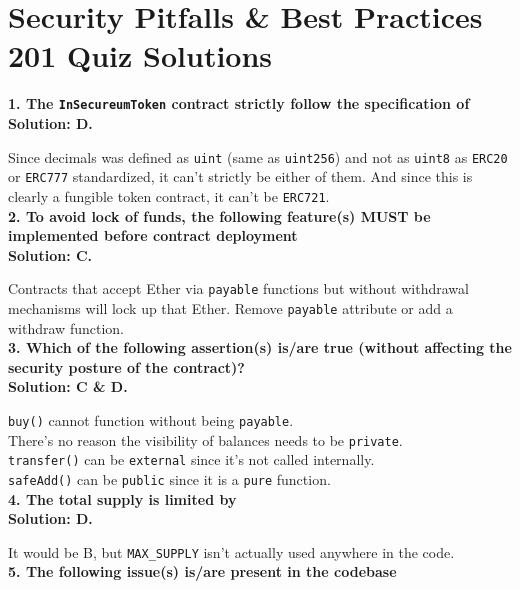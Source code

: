 \section{Security Pitfalls \& Best Practices 201 Quiz Solutions}

\textbf{1. The \texttt{InSecureumToken} contract strictly follow the specification of}\label{sec:exam5_q1}\\

\textbf{Solution: D.}

Since decimals was defined as \verb|uint| (same as \verb|uint256|) and not as \verb|uint8| as \verb|ERC20| or \verb|ERC777| standardized, it can't strictly be either of them.
And since this is clearly a fungible token contract, it can't be \verb|ERC721|.\\

\textbf{2. To avoid lock of funds, the following feature(s) MUST be implemented before contract deployment}\label{sec:exam5_q2}\\

\textbf{Solution: C.}

Contracts that accept Ether via \verb|payable| functions but without withdrawal mechanisms will lock up that Ether.
Remove \verb|payable| attribute or add a withdraw function.\\

\textbf{3. Which of the following assertion(s) is/are true (without affecting the security posture of the contract)?}\label{sec:exam5_q3}\\

\textbf{Solution: C \& D.}

\verb|buy()| cannot function without being \verb|payable|.\\
There's no reason the visibility of balances needs to be \verb|private|.\\
\verb|transfer()| can be \verb|external| since it's not called internally.\\
\verb|safeAdd()| can be \verb|public| since it is a \verb|pure| function.\\

\textbf{4. The total supply is limited by}\label{sec:exam5_q4}\\

\textbf{Solution: D.}

It would be B, but \verb|MAX_SUPPLY| isn't actually used anywhere in the code.\\

\textbf{5. The following issue(s) is/are present in the codebase}\label{sec:exam5_q5}\\

